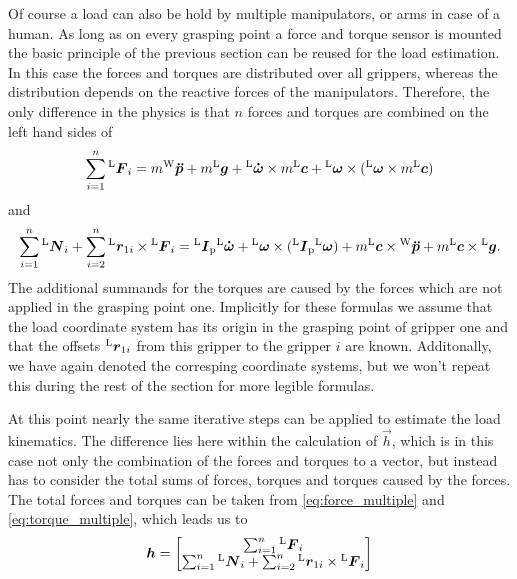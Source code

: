 Of course a load can also be hold by multiple manipulators, or arms in case of a human. As long as on every grasping point a force and torque sensor is mounted the basic principle of the previous section can be reused for the load estimation. In this case the forces and torques are distributed over all grippers, whereas the distribution depends on the reactive forces of the manipulators. Therefore, the only difference in the physics is that $n$ forces and torques are combined on the left hand sides of
\begin{equation}
	\sum_{i = 1}^{n}  {^{\mathrm{L}}}\boldsymbol{F}_{i} = m {^{\mathrm{W}}}\boldsymbol{\ddot{p}} + m {^{\mathrm{L}}}\boldsymbol{g} + {^{\mathrm{L}}}\boldsymbol{\dot{\omega}} \times m {^{\mathrm{L}}}\boldsymbol{c} + {^{\mathrm{L}}}\boldsymbol{\omega} \times ({^{\mathrm{L}}}\boldsymbol{\omega} \times m {^{\mathrm{L}}}\boldsymbol{c})
	\label{eq:force_multiple}	
\end{equation}
and
\begin{equation}
	\sum_{i = 1}^n {^{\mathrm{L}}}\boldsymbol{N}_{i} + \sum_{i = 2}^n {^{\mathrm{L}}}\boldsymbol{r}_{1i} \times {^{\mathrm{L}}}\boldsymbol{F}_{i} = {^{\mathrm{L}}}\boldsymbol{I}_{\mathrm{p}} {^{\mathrm{L}}}\boldsymbol{\dot{\omega}} + {^{\mathrm{L}}}\boldsymbol{\omega} \times ({^{\mathrm{L}}}\boldsymbol{I}_{\mathrm{p}} {^{\mathrm{L}}}\boldsymbol{\omega}) + m {^{\mathrm{L}}}\boldsymbol{c} \times {^{\mathrm{W}}}\boldsymbol{\ddot{p}} + m {^{\mathrm{L}}}\boldsymbol{c} \times {^{\mathrm{L}}}\boldsymbol{g}.
	\label{eq:torque_multiple}	
\end{equation}
The additional summands for the torques are caused by the forces which are not applied in the grasping point one. Implicitly for these formulas we assume that the load coordinate system has its origin in the grasping point of gripper one and that the offsets ${^{\mathrm{L}}}\boldsymbol{r}_{1i}$ from this gripper to the gripper $i$ are known. Additonally, we have again denoted the corresping coordinate systems, but we won't repeat this during the rest of the section for more legible formulas.

At this point nearly the same iterative steps can be applied to estimate the load kinematics. The difference lies here within the calculation of $\vec{h}$, which is in this case not only the combination of the forces and torques to a vector, but instead has to consider the total sums of forces, torques and torques caused by the forces. The total forces and torques can be taken from \ref{eq:force_multiple} and \ref{eq:torque_multiple}, which leads us to
\begin{equation}
	\boldsymbol{h} = 
	\begin{bmatrix}
		\sum_{i = 1}^n {^{\mathrm{L}}}\boldsymbol{F}_{i} \\
		\sum_{i = 1}^n {^{\mathrm{L}}}\boldsymbol{N}_{i} + \sum_{i = 2}^n {^{\mathrm{L}}}\boldsymbol{r}_{1i} \times {^{\mathrm{L}}}\boldsymbol{F}_{i}
	\end{bmatrix}
\end{equation}


